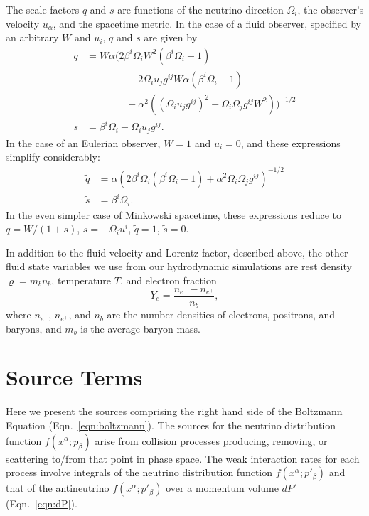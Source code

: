 \documentclass[aps,floatfix,prd,superscriptaddress,twocolumn]{revtex4-1}
\begin{document}
The scale factors $q$ and $s$ are functions of the neutrino
direction $\Omega_i$, the observer's velocity $u_\alpha$,
and the spacetime metric.
In the case of a fluid observer, specified by an arbitrary $W$ and $u_i$,
$q$ and $s$ are given by
\begin{align}
  \label{eqn:q_general}
  q
  &= W\alpha\Bigg(2\beta^i\Omega_i W^2(\beta^i\Omega_i-1) \nonumber\\
  &\qquad\qquad - 2\Omega_i u_j g^{ij} W \alpha(\beta^i\Omega_i-1)\nonumber\\
  &\qquad\qquad + \alpha^2\left((\Omega_i u_j g^{ij})^2+\Omega_i\Omega_j g^{ij}W^2\right)\Bigg)^{-1/2}\\
  \label{eqn:s_general}
  s
  &= \beta^i\Omega_i -\Omega_i u_j g^{ij}.
\end{align}
In the case of an Eulerian observer, $W=1$ and $u_i=0$,
and these expressions simplify considerably:
\begin{align}
  \label{eqn:q_eulerian}
  \tilde{q}
  &= \alpha\left(2\beta^i\Omega_i(\beta^i\Omega_i-1)+\alpha^2\Omega_i\Omega_j g^{ij}\right)^{-1/2}\\
  \label{eqn:s_eulerian}
  \tilde{s}
  &= \beta^i\Omega_i.
\end{align}
In the even simpler case of Minkowski spacetime, these expressions
reduce to $q=W/(1+s)$, $s=-\Omega_i u^i$,
$\tilde{q}=1$, $\tilde{s}=0$.

In addition to the fluid velocity and Lorentz factor, described above, the
other fluid state variables we use from our hydrodynamic simulations
are rest density $\varrho=m_b n_b$, temperature $T$, and electron fraction
\begin{equation}
  Y_e = \frac{n_{e^-} - n_{e^+}}{n_b},
\end{equation}
where $n_{e^-}$, $n_{e^+}$, and $n_b$ are the number densities of electrons,
positrons, and baryons, and $m_b$ is the average baryon mass.

\section{Source Terms}
\label{sec:source_terms}
Here we present the sources comprising the right hand side of the
Boltzmann Equation (Eqn.~\ref{eqn:boltzmann}). The sources for the neutrino
distribution function $f(x^\alpha;p_\beta)$ arise from collision processes
producing, removing, or scattering to/from that point in phase space.
The weak interaction rates for each process involve integrals of
the neutrino distribution function $f(x^\alpha;p'_\beta)$ and that of the
antineutrino $\bar{f}(x^\alpha;p'_\beta)$ over a momentum volume
$dP'$ (Eqn.~\ref{eqn:dP}).
\end{document}
